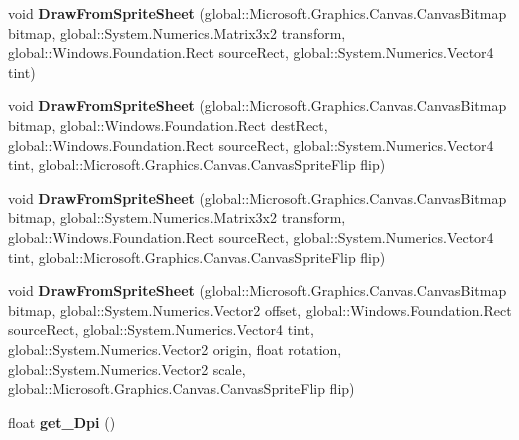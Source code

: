 \begin{DoxyCompactItemize}
void {\bfseries Draw\+From\+Sprite\+Sheet} (global\+::\+Microsoft.\+Graphics.\+Canvas.\+Canvas\+Bitmap bitmap, global\+::\+System.\+Numerics.\+Matrix3x2 transform, global\+::\+Windows.\+Foundation.\+Rect source\+Rect, global\+::\+System.\+Numerics.\+Vector4 tint)
\item 
\mbox{\label{class_microsoft_1_1_graphics_1_1_canvas_1_1_canvas_sprite_batch_a1a86d8b0f90e3534b1f78de4ab54d5b6}} 
void {\bfseries Draw\+From\+Sprite\+Sheet} (global\+::\+Microsoft.\+Graphics.\+Canvas.\+Canvas\+Bitmap bitmap, global\+::\+Windows.\+Foundation.\+Rect dest\+Rect, global\+::\+Windows.\+Foundation.\+Rect source\+Rect, global\+::\+System.\+Numerics.\+Vector4 tint, global\+::\+Microsoft.\+Graphics.\+Canvas.\+Canvas\+Sprite\+Flip flip)
\item 
\mbox{\label{class_microsoft_1_1_graphics_1_1_canvas_1_1_canvas_sprite_batch_afb583c7529206d1438558f6816c5e862}} 
void {\bfseries Draw\+From\+Sprite\+Sheet} (global\+::\+Microsoft.\+Graphics.\+Canvas.\+Canvas\+Bitmap bitmap, global\+::\+System.\+Numerics.\+Matrix3x2 transform, global\+::\+Windows.\+Foundation.\+Rect source\+Rect, global\+::\+System.\+Numerics.\+Vector4 tint, global\+::\+Microsoft.\+Graphics.\+Canvas.\+Canvas\+Sprite\+Flip flip)
\item 
\mbox{\label{class_microsoft_1_1_graphics_1_1_canvas_1_1_canvas_sprite_batch_adf9c3f59de40a640884b277dc8f5f51e}} 
void {\bfseries Draw\+From\+Sprite\+Sheet} (global\+::\+Microsoft.\+Graphics.\+Canvas.\+Canvas\+Bitmap bitmap, global\+::\+System.\+Numerics.\+Vector2 offset, global\+::\+Windows.\+Foundation.\+Rect source\+Rect, global\+::\+System.\+Numerics.\+Vector4 tint, global\+::\+System.\+Numerics.\+Vector2 origin, float rotation, global\+::\+System.\+Numerics.\+Vector2 scale, global\+::\+Microsoft.\+Graphics.\+Canvas.\+Canvas\+Sprite\+Flip flip)
\item 
\mbox{\label{class_microsoft_1_1_graphics_1_1_canvas_1_1_canvas_sprite_batch_ac7c3fcb4f10743d465779d1001600913}} 
float {\bfseries get\+\_\+\+Dpi} ()
\item 
\mbox{\label{class_microsoft_1_1_graphics_1_1_canvas_1_1_canvas_sprite_batch_a892b10eda90f5263ebc1628954d0baf9}} 

\end{DoxyCompactItemize}
